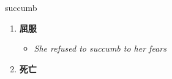 
\begin{frame}
{\huge succumb}
\begin{center}
\begin{enumerate}\Large
  \item \textbf{屈服}
  \begin{itemize}
    \item \em{\Large{She refused to succumb to her fears}}
  \end{itemize}
  \item \textbf{死亡}
\end{enumerate}
\end{center}
\end{frame}
